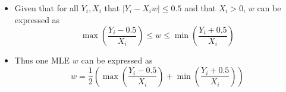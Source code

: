 \begin{itemize}
    \item[] Given that for all $Y_i, X_i$ that $\lvert Y_i - X_i w \rvert \leq 0.5$ and that $X_i > 0$, $w$ can be expressed as 
	$$ \max \left( \frac{Y_i - 0.5}{X_i} \right) \leq w \leq \min \left( \frac{Y_i + 0.5}{X_i} \right) $$
    \item[] Thus one MLE $w$ can be expressed as
	$$ \boxed{ w = \frac{1}{2} \left( \max \left( \frac{Y_i - 0.5}{X_i} \right) + \min \left( \frac{Y_i + 0.5}{X_i} \right) \right) } $$
\end{itemize}
